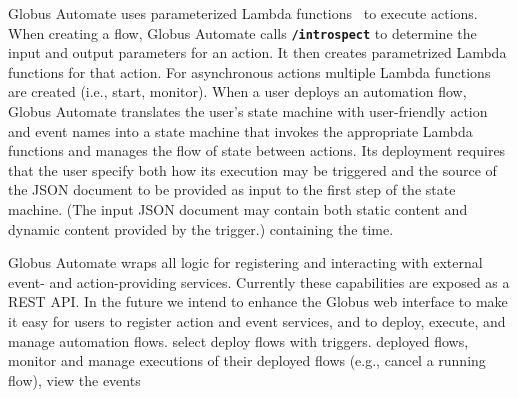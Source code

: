 \documentclass{aip-cp}
\newcommand\code[1]{{\tt \footnotesize #1}}
\newcommand\darkcode[1]{\code{\textbf{#1}}}
\begin{document}
Globus Automate uses parameterized Lambda functions~\cite{AmazonLambda} to execute actions. 
When creating a flow, Globus Automate calls \darkcode{/introspect} 
to determine the input and output parameters for an action. It then creates 
parametrized Lambda functions for that action. 
For asynchronous actions multiple Lambda functions are created (i.e., start, monitor).
When a user deploys an automation flow, Globus Automate translates the user's state machine 
with user-friendly action and event names into a state machine that invokes the appropriate 
Lambda functions and manages the flow of state between actions. 
Its deployment requires that the user specify both how its execution may be triggered and the source 
of
the JSON document to be provided as input to the first step of the state machine. 
(The input JSON document may contain both static content and 
dynamic content provided by the trigger.)
containing the time.

Globus Automate wraps all logic for registering and interacting with external event- and 
action-providing services.  Currently these capabilities are exposed as a REST API. 
In the future we intend to enhance the Globus web interface to make it 
easy for users to register action and event services,
and to deploy, execute, and manage automation flows.
select
deploy flows with triggers. 
deployed flows, monitor and manage executions of their deployed flows (e.g., cancel a running flow), 
view the events
\end{document}
